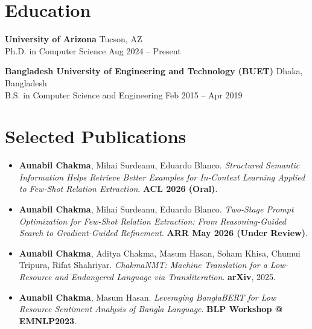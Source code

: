 \documentclass[10pt]{extarticle}
\begin{document}



\section*{Education}
\textbf{University of Arizona} \hfill Tucson, AZ\\
\hspace*{1em}Ph.D. in Computer Science \hfill Aug 2024 -- Present

\textbf{Bangladesh University of Engineering and Technology (BUET)} \hfill Dhaka, Bangladesh\\
\hspace*{1em}B.S. in Computer Science and Engineering \hfill Feb 2015 -- Apr 2019

\section*{Selected Publications}
\begin{itemize}
    \item \textbf{Aunabil Chakma}, Mihai Surdeanu, Eduardo Blanco. \textit{Structured Semantic Information Helps Retrieve Better Examples for In-Context Learning Applied to Few-Shot Relation Extraction}. \textbf{ACL 2026 (Oral)}.
    \item \textbf{Aunabil Chakma}, Mihai Surdeanu, Eduardo Blanco. \textit{Two-Stage Prompt Optimization for Few-Shot Relation Extraction: From Reasoning-Guided Search to Gradient-Guided Refinement}. \textbf{ARR May 2026 (Under Review)}.
    \item \textbf{Aunabil Chakma}, Aditya Chakma, Masum Hasan, Soham Khisa, Chumui Tripura, Rifat Shahriyar. \textit{ChakmaNMT: Machine Translation for a Low-Resource and Endangered Language via Transliteration}. \textbf{arXiv}, 2025.
    \item \textbf{Aunabil Chakma}, Masum Hasan. \textit{Leveraging BanglaBERT for Low Resource Sentiment Analysis of Bangla Language}. \textbf{BLP Workshop @ EMNLP2023}.
\end{itemize}
\end{document}
